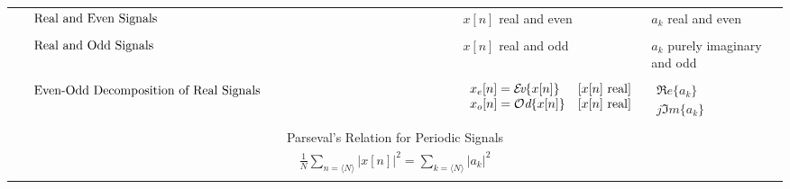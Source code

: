 \documentclass[12pt]{article}
\numberwithin{equation}{section}
\newcommand{\Ev}{\mbox{$\cal E\!$\it v}}
\newcommand{\Od}{\mbox{$\cal O$\it d}}
\begin{document}
\begin{table}[tbp]
\begin{center}
\begin{tabular}{p{1.5in}ll}
{\small $\vcenter{Real and Even Signals}$}
 & $\displaystyle x[n]$ real and even
 & $\displaystyle a_k$ real and even
 \\
 \\
{\small $\vcenter{Real and Odd Signals}$}
 & $\displaystyle x[n]$ real and odd
 & $\displaystyle a_k$ purely imaginary and odd
 \\
 \\
{\small $\vcenter{Even-Odd Decomposition of Real Signals}$} &
$\displaystyle
  \begin{array}{ll}
    x_{e}[n] = \Ev \{x[n]\} & [x[n]\ {\rm real}] \\%
    x_{o}[n] = \Od \{x[n]\} & [x[n]\ {\rm real}]
  \end{array}$
& $\displaystyle
  \begin{array}{l}
    \Re e\{a_{k}\} \\
    j\Im m\{a_{k}\}
  \end{array}$
\\
\multicolumn{3}{l}{ } \\
\multicolumn{3}{c}{Parseval's Relation for Periodic Signals} \\
\multicolumn{3}{c}{
 $\displaystyle \frac{1}{N} \sum_{n=\langle N\rangle} |x[n]|^{2} =
\sum_{k=\langle N\rangle} |a_{k}|^{2}$} \\
 & \\ \hline
\end{tabular}
\end{center}
\end{table}
\clearpage


%
%
\end{document}
